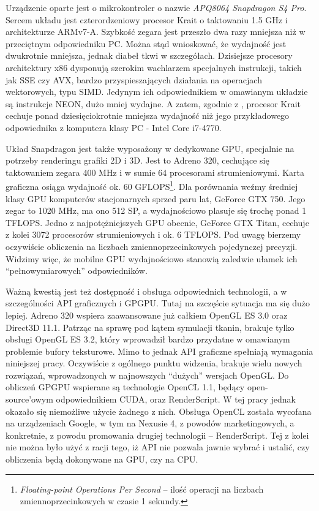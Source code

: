 		Urządzenie oparte jest o mikrokontroler o nazwie \emph{APQ8064 Snapdragon S4 Pro}. Sercem układu jest czterordzeniowy procesor Krait o taktowaniu 1.5 GHz i architekturze ARMv7-A. Szybkość zegara jest przeszło dwa razy mniejsza niż w przeciętnym odpowiedniku PC. Można stąd wnioskować, że wydajność jest dwukrotnie mniejsza, jednak diabeł tkwi w szczegółach. Dzisiejsze procesory architektury x86 dysponują szerokim wachlarzem specjalnych instrukcji, takich jak SSE czy AVX, bardzo przyspieszających działania na operacjach wektorowych, typu SIMD. Jedynym ich odpowiednikiem w omawianym układzie są instrukcje NEON, dużo mniej wydajne. A zatem, zgodnie z \cite{versus}, procesor Krait cechuje ponad dziesięciokrotnie mniejsza wydajność niż jego przykładowego odpowiednika z komputera klasy PC - Intel Core i7-4770.
		
		Układ Snapdragon jest także wyposażony w dedykowane GPU, specjalnie na potrzeby renderingu grafiki 2D i 3D. Jest to Adreno 320, cechujące się taktowaniem zegara 400 MHz i w sumie 64 procesorami strumieniowymi. Karta graficzna osiąga wydajność ok. 60 GFLOPS\footnote{\emph{Floating-point Operations Per Second} -- ilość operacji na liczbach zmiennoprzecinkowych w czasie 1 sekundy.}. Dla porównania weźmy średniej klasy GPU komputerów stacjonarnych sprzed paru lat, GeForce GTX 750. Jego zegar to 1020 MHz, ma ono 512 SP, a wydajnościowo plasuje się trochę ponad 1 TFLOPS. Jedno z najpotężniejszych GPU obecnie, GeForce GTX Titan, cechuje z kolei 3072 procesorów strumieniowych i ok. 6 TFLOPS. Pod uwagę bierzemy oczywiście obliczenia na liczbach zmiennoprzecinkowych pojedynczej precyzji. Widzimy więc, że mobilne GPU wydajnościowo stanowią zaledwie ułamek ich ``pełnowymiarowych'' odpowiedników.
		
		Ważną kwestią jest też dostępność i obsługa odpowiednich technologii, a w szczególności API graficznych i GPGPU. Tutaj na szczęście sytuacja ma się dużo lepiej. Adreno 320 wspiera zaawansowane już całkiem OpenGL ES 3.0 oraz Direct3D 11.1. Patrząc na sprawę pod kątem symulacji tkanin, brakuje tylko obsługi OpenGL ES 3.2, który wprowadził bardzo przydatne w omawianym problemie bufory teksturowe. Mimo to jednak API graficzne spełniają wymagania niniejszej pracy. Oczywiście z ogólnego punktu widzenia, brakuje wielu nowych rozwiązań, wprowadzonych w najnowszych ``dużych'' wersjach OpenGL. Do obliczeń GPGPU wspierane są technologie OpenCL 1.1, będący open-source'owym odpowiednikiem CUDA, oraz RenderScript. W tej pracy jednak okazało się niemożliwe użycie żadnego z nich. Obsługa OpenCL została wycofana na urządzeniach Google, w tym na Nexusie 4, z powodów marketingowych, a konkretnie, z powodu promowania drugiej technologii -- RenderScript. Tej z kolei nie można było użyć z racji tego, iż API nie pozwala jawnie wybrać i ustalić, czy obliczenia będą dokonywane na GPU, czy na CPU.
		
